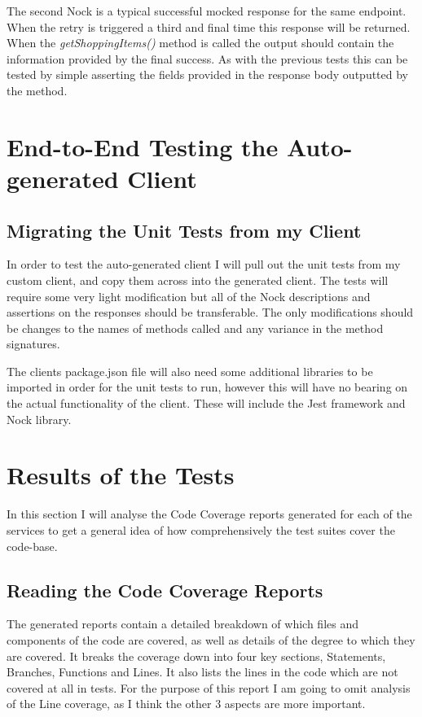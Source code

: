 The second Nock is a typical successful mocked response for the same endpoint. When the retry is triggered a third and final time this response will be returned. When the \textit{getShoppingItems()} method is called the output should contain the information provided by the final success. As with the previous tests this can be tested by simple asserting the fields provided in the response body outputted by the method.
\section{End-to-End Testing the Auto-generated Client}
\subsection{Migrating the Unit Tests from my Client}
In order to test the auto-generated client I will pull out the unit tests from my custom client, and copy them across into the generated client. The tests will require some very light modification but all of the Nock descriptions and assertions on the responses should be transferable. The only modifications should be changes to the names of methods called and any variance in the method signatures.

The clients package.json file will also need some additional libraries to be imported in order for the unit tests to run, however this will have no bearing on the actual functionality of the client. These will include the Jest framework and Nock library.
\section{Results of the Tests}
In this section I will analyse the Code Coverage reports generated for each of the services to get a general idea of how comprehensively the test suites  cover the code-base.
\FloatBarrier
\subsection{Reading the Code Coverage Reports}
The generated reports contain a detailed breakdown of which files and components of the code are covered, as well as details of the degree to which they are covered. It breaks the coverage down into four key sections, Statements, Branches, Functions and Lines. It also lists the lines in the code which are not covered at all in tests. For the purpose of this report I am going to omit analysis of the Line coverage, as I think the other 3 aspects are more important.
